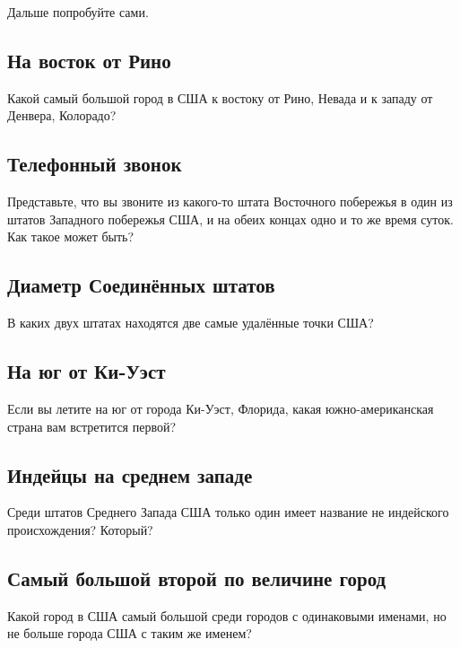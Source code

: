 Дальше попробуйте сами.

\subsection*{На восток от Рино}%

Какой самый большой город в США к востоку от Рино, Невада и к западу от Денвера, Колорадо? 

\subsection*{Телефонный звонок}%

Представьте, что вы звоните из какого-то штата Восточного побережья в один из штатов Западного побережья США, и на обеих концах одно и то же время суток.
Как такое может быть? 
  

\subsection*{Диаметр Соединённых штатов}%

В каких двух штатах находятся две самые удалённые точки США? 
  

\subsection*{На юг от Ки-Уэст}%

Если вы летите на юг от города Ки-Уэст, Флорида, какая южно-американская страна вам 
встретится первой? 

\subsection*{Индейцы на среднем западе}%

Среди штатов Среднего Запада США только один имеет название не индейского происхождения? Который?    

\subsection*{Самый большой второй по величине город}%

Какой город в США самый большой среди городов с одинаковыми именами, но не больше города США с таким же именем?

